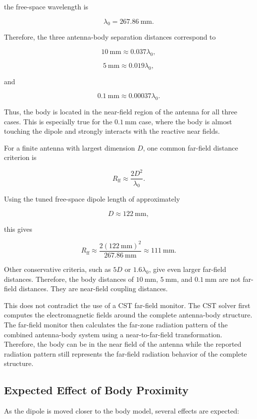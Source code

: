 the free-space wavelength is

\[
\lambda_0 = 267.86~\mathrm{mm}.
\]

Therefore, the three antenna-body separation distances correspond to

\[
10~\mathrm{mm} \approx 0.037\lambda_0,
\]

\[
5~\mathrm{mm} \approx 0.019\lambda_0,
\]

and

\[
0.1~\mathrm{mm} \approx 0.00037\lambda_0.
\]

Thus, the body is located in the near-field region of the antenna for all three cases. This is especially true for the \(0.1~\mathrm{mm}\) case, where the body is almost touching the dipole and strongly interacts with the reactive near fields.

For a finite antenna with largest dimension \(D\), one common far-field distance criterion is

\[
R_{\mathrm{ff}} \approx \frac{2D^2}{\lambda_0}.
\]

Using the tuned free-space dipole length of approximately

\[
D \approx 122~\mathrm{mm},
\]

this gives

\[
R_{\mathrm{ff}}
\approx
\frac{2(122~\mathrm{mm})^2}{267.86~\mathrm{mm}}
\approx
111~\mathrm{mm}.
\]

Other conservative criteria, such as \(5D\) or \(1.6\lambda_0\), give even larger far-field distances. Therefore, the body distances of \(10~\mathrm{mm}\), \(5~\mathrm{mm}\), and \(0.1~\mathrm{mm}\) are not far-field distances. They are near-field coupling distances.

This does not contradict the use of a CST far-field monitor. The CST solver first computes the electromagnetic fields around the complete antenna-body structure. The far-field monitor then calculates the far-zone radiation pattern of the combined antenna-body system using a near-to-far-field transformation. Therefore, the body can be in the near field of the antenna while the reported radiation pattern still represents the far-field radiation behavior of the complete structure.

\subsection{Expected Effect of Body Proximity}

As the dipole is moved closer to the body model, several effects are expected:

